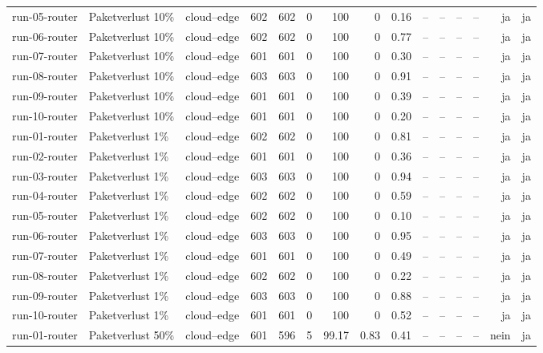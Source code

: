 \begin{table}
{\begin{tabular}{l l p{3.2cm} r r r r r r r r r r r r}
run-05-router & Paketverlust 10\% & cloud--edge & 602 & 602 & 0 & 100 & 0 & 0.16 & -- & -- & -- & -- & ja & ja \\
run-06-router & Paketverlust 10\% & cloud--edge & 602 & 602 & 0 & 100 & 0 & 0.77 & -- & -- & -- & -- & ja & ja \\
run-07-router & Paketverlust 10\% & cloud--edge & 601 & 601 & 0 & 100 & 0 & 0.30 & -- & -- & -- & -- & ja & ja \\
run-08-router & Paketverlust 10\% & cloud--edge & 603 & 603 & 0 & 100 & 0 & 0.91 & -- & -- & -- & -- & ja & ja \\
run-09-router & Paketverlust 10\% & cloud--edge & 601 & 601 & 0 & 100 & 0 & 0.39 & -- & -- & -- & -- & ja & ja \\
run-10-router & Paketverlust 10\% & cloud--edge & 601 & 601 & 0 & 100 & 0 & 0.20 & -- & -- & -- & -- & ja & ja \\
run-01-router & Paketverlust 1\% & cloud--edge & 602 & 602 & 0 & 100 & 0 & 0.81 & -- & -- & -- & -- & ja & ja \\
run-02-router & Paketverlust 1\% & cloud--edge & 601 & 601 & 0 & 100 & 0 & 0.36 & -- & -- & -- & -- & ja & ja \\
run-03-router & Paketverlust 1\% & cloud--edge & 603 & 603 & 0 & 100 & 0 & 0.94 & -- & -- & -- & -- & ja & ja \\
run-04-router & Paketverlust 1\% & cloud--edge & 602 & 602 & 0 & 100 & 0 & 0.59 & -- & -- & -- & -- & ja & ja \\
run-05-router & Paketverlust 1\% & cloud--edge & 602 & 602 & 0 & 100 & 0 & 0.10 & -- & -- & -- & -- & ja & ja \\
run-06-router & Paketverlust 1\% & cloud--edge & 603 & 603 & 0 & 100 & 0 & 0.95 & -- & -- & -- & -- & ja & ja \\
run-07-router & Paketverlust 1\% & cloud--edge & 601 & 601 & 0 & 100 & 0 & 0.49 & -- & -- & -- & -- & ja & ja \\
run-08-router & Paketverlust 1\% & cloud--edge & 602 & 602 & 0 & 100 & 0 & 0.22 & -- & -- & -- & -- & ja & ja \\
run-09-router & Paketverlust 1\% & cloud--edge & 603 & 603 & 0 & 100 & 0 & 0.88 & -- & -- & -- & -- & ja & ja \\
run-10-router & Paketverlust 1\% & cloud--edge & 601 & 601 & 0 & 100 & 0 & 0.52 & -- & -- & -- & -- & ja & ja \\
run-01-router & Paketverlust 50\% & cloud--edge & 601 & 596 & 5 & 99.17 & 0.83 & 0.41 & -- & -- & -- & -- & nein & ja \\

\end{tabular}}
\end{table}
